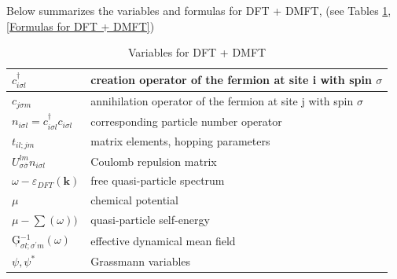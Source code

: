 \documentclass[12 pt]{article}
\begin{document}
  Below summarizes the variables and formulas for DFT + DMFT, (see Tables \ref{Variables for DFT + DMFT}, 
\ref{Formulas for DFT + DMFT}) \citep {Kotliar2006, Kotliar2004} 


  \begin{table}[htp]
    \centering
    \caption{Variables for DFT + DMFT}
    \label{Variables for DFT + DMFT}
    \vspace{2ex}

  \begin{tabular}{|l|l|}
    \hline
    $c_{i\sigma l}^{\dagger}$ &  creation operator of the fermion at site i with spin $\sigma$ \\ \hline

    $c_{j\sigma m}$ &  annihilation operator of the fermion at site j with spin $\sigma$ \\ \hline

    $n_{i\sigma l} = c_{i\sigma l}^{\dagger}c_{i\sigma l}$ &  corresponding particle number operator \\ \hline

    $t_{il;jm}$ &  matrix elements, hopping parameters \\ \hline

    $U_{\sigma\overline{\sigma}}^{lm}n_{i\sigma l}$ &  Coulomb repulsion matrix \\ \hline

    $\omega-\varepsilon_{DFT}(\textbf{k})$ &  free quasi-particle spectrum\\ \hline

    $\mu$ &  chemical potential \\ \hline

    $\mu-\sum(\omega))$ &  quasi-particle self-energy \\ \hline

    \c{G}$_{\sigma l;\sigma^\prime m}^{-1}(\omega)$ &  effective dynamical mean field \\ \hline

    $\psi,\psi^*$ &  Grassmann variables \\ \hline

  \end{tabular}

  \end{table}
\end{document}
